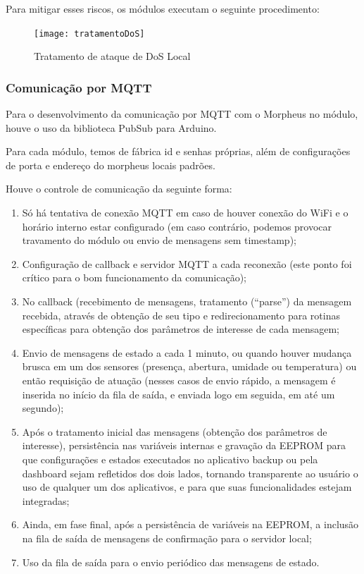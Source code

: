 Para mitigar esses riscos, os módulos executam o seguinte procedimento:

\begin{figure}[H]
	\centering
	\caption{Tratamento de ataque de DoS Local}
  \texttt{[image: tratamentoDoS]}
\label{fig:tratamentoDoS}
\end{figure}

\subsubsection{Comunicação por MQTT}
Para o desenvolvimento da comunicação por MQTT com o Morpheus no módulo, houve o uso da biblioteca PubSub para Arduino.

Para cada módulo, temos de fábrica id e senhas próprias, além de configurações de porta e endereço do morpheus locais padrões.

Houve o controle de comunicação da seguinte forma:

\begin{enumerate}
	\item Só há tentativa de conexão MQTT em caso de houver conexão do WiFi e o horário interno estar configurado (em caso contrário, podemos provocar travamento do módulo ou envio de mensagens sem timestamp);
	\item Configuração de callback e servidor MQTT a cada reconexão (este ponto foi crítico para o bom funcionamento da comunicação);
	\item No callback (recebimento de mensagens, tratamento (“parse”) da mensagem recebida, através de obtenção de seu tipo e redirecionamento para rotinas específicas para obtenção dos parâmetros de interesse de cada mensagem;
	\item Envio de mensagens de estado a cada 1 minuto, ou quando houver mudança brusca em um dos sensores (presença, abertura, umidade ou temperatura) ou então requisição de atuação (nesses casos de envio rápido, a mensagem é inserida no início da fila de saída, e enviada logo em seguida, em até um segundo);
	\item Após o tratamento inicial das mensagens (obtenção dos parâmetros de interesse), persistência nas variáveis internas e gravação da EEPROM para que configurações e estados executados no aplicativo backup ou pela dashboard sejam refletidos dos dois lados, tornando transparente ao usuário o uso de qualquer um dos aplicativos, e para que suas funcionalidades estejam integradas;
	\item Ainda, em fase final, após a persistência de variáveis na EEPROM, a inclusão na fila de saída de mensagens de confirmação para o servidor local;
	\item Uso da fila de saída para o envio periódico das mensagens de estado.
\end{enumerate}


